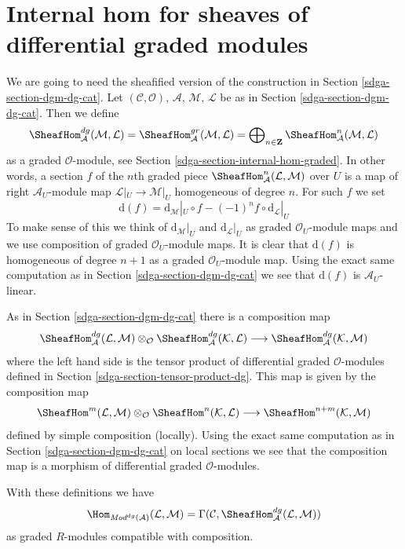 \section{Internal hom for sheaves of differential graded modules}
\label{sdga-section-internal-hom-dg}
We are going to need the sheafified version of the construction
in Section \ref{sdga-section-dgm-dg-cat}.
Let $(\mathcal{C}, \mathcal{O})$, $\mathcal{A}$,
$\mathcal{M}$, $\mathcal{L}$ be as in Section \ref{sdga-section-dgm-dg-cat}.
Then we define
$$
\SheafHom^{dg}_\mathcal{A}(\mathcal{M}, \mathcal{L}) =
\SheafHom^{gr}_\mathcal{A}(\mathcal{M}, \mathcal{L}) =
\bigoplus\nolimits_{n \in \mathbf{Z}}
\SheafHom^n_\mathcal{A}(\mathcal{M}, \mathcal{L})
$$
as a graded $\mathcal{O}$-module, see
Section \ref{sdga-section-internal-hom-graded}.
In other words, a section $f$ of the $n$th graded piece
$\SheafHom^n_\mathcal{A}(\mathcal{L}, \mathcal{M})$ over $U$
is a map of right $\mathcal{A}_U$-module map
$\mathcal{L}|_U \to \mathcal{M}|_U$ homogeneous of degree $n$.
For such $f$ we set
$$
\text{d}(f) =
\text{d}_\mathcal{M}|_U \circ f - (-1)^n f \circ \text{d}_\mathcal{L}|_U
$$
To make sense of this we think of $\text{d}_\mathcal{M}|_U$ and
$\text{d}_\mathcal{L}|_U$ as graded $\mathcal{O}_U$-module maps and
we use composition of graded $\mathcal{O}_U$-module maps.
It is clear that $\text{d}(f)$ is homogeneous of
degree $n + 1$ as a graded $\mathcal{O}_U$-module map.
Using the exact same computation as in Section \ref{sdga-section-dgm-dg-cat}
we see that $\text{d}(f)$ is $\mathcal{A}_U$-linear.

\medskip\noindent
As in Section \ref{sdga-section-dgm-dg-cat} there is a composition map
$$
\SheafHom^{dg}_\mathcal{A}(\mathcal{L}, \mathcal{M}) \otimes_\mathcal{O}
\SheafHom^{dg}_\mathcal{A}(\mathcal{K}, \mathcal{L})
\longrightarrow
\SheafHom^{dg}_\mathcal{A}(\mathcal{K}, \mathcal{M})
$$
where the left hand side is the tensor product of
differential graded $\mathcal{O}$-modules
defined in Section \ref{sdga-section-tensor-product-dg}. This map
is given by the composition map
$$
\SheafHom^m(\mathcal{L}, \mathcal{M}) \otimes_\mathcal{O}
\SheafHom^n(\mathcal{K}, \mathcal{L}) \longrightarrow
\SheafHom^{n + m}(\mathcal{K}, \mathcal{M})
$$
defined by simple composition (locally). Using the exact same
computation as in Section \ref{sdga-section-dgm-dg-cat} on local sections
we see that the composition map is a morphism of differential
graded $\mathcal{O}$-modules.

\medskip\noindent
With these definitions we have
$$
\Hom_{\textit{Mod}^{dg}(\mathcal{A})}(\mathcal{L}, \mathcal{M}) =
\Gamma(\mathcal{C}, \SheafHom^{dg}_\mathcal{A}(\mathcal{L}, \mathcal{M}))
$$
as graded $R$-modules compatible with composition.

